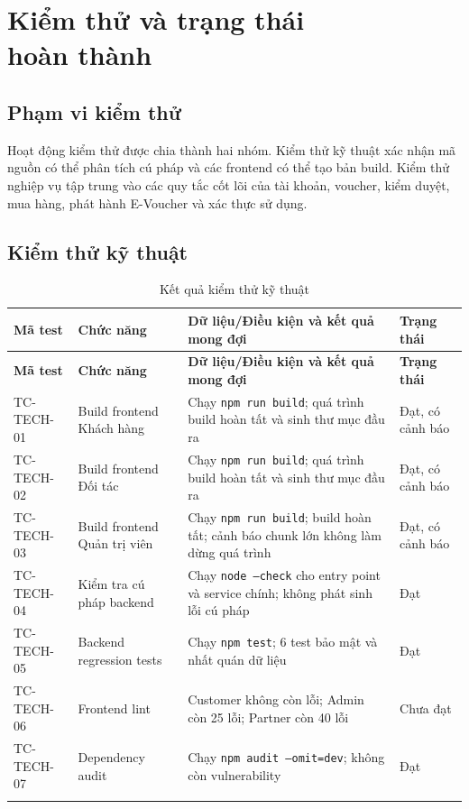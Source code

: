 \chapter[Kiểm thử và trạng thái hoàn thành]{Kiểm thử và trạng thái\\ hoàn thành}

\section{Phạm vi kiểm thử}

Hoạt động kiểm thử được chia thành hai nhóm. Kiểm thử kỹ thuật xác nhận mã nguồn có thể phân tích cú pháp và các frontend có thể tạo bản build. Kiểm thử nghiệp vụ tập trung vào các quy tắc cốt lõi của tài khoản, voucher, kiểm duyệt, mua hàng, phát hành E-Voucher và xác thực sử dụng.

\section{Kiểm thử kỹ thuật}

\begin{longtable}{|p{1.8cm}|p{3.5cm}|p{5.8cm}|p{2.3cm}|}
\hline
\textbf{Mã test} & \textbf{Chức năng} & \textbf{Dữ liệu/Điều kiện và kết quả mong đợi} & \textbf{Trạng thái} \\ \hline
\endfirsthead
\hline
\textbf{Mã test} & \textbf{Chức năng} & \textbf{Dữ liệu/Điều kiện và kết quả mong đợi} & \textbf{Trạng thái} \\ \hline
\endhead
TC-TECH-01 & Build frontend Khách hàng & Chạy \texttt{npm run build}; quá trình build hoàn tất và sinh thư mục đầu ra & Đạt, có cảnh báo \\ \hline
TC-TECH-02 & Build frontend Đối tác & Chạy \texttt{npm run build}; quá trình build hoàn tất và sinh thư mục đầu ra & Đạt, có cảnh báo \\ \hline
TC-TECH-03 & Build frontend Quản trị viên & Chạy \texttt{npm run build}; build hoàn tất; cảnh báo chunk lớn không làm dừng quá trình & Đạt, có cảnh báo \\ \hline
TC-TECH-04 & Kiểm tra cú pháp backend & Chạy \texttt{node --check} cho entry point và service chính; không phát sinh lỗi cú pháp & Đạt \\ \hline
TC-TECH-05 & Backend regression tests & Chạy \texttt{npm test}; 6 test bảo mật và nhất quán dữ liệu & Đạt \\ \hline
TC-TECH-06 & Frontend lint & Customer không còn lỗi; Admin còn 25 lỗi; Partner còn 40 lỗi & Chưa đạt \\ \hline
TC-TECH-07 & Dependency audit & Chạy \texttt{npm audit --omit=dev}; không còn vulnerability & Đạt \\ \hline
\caption[]{Kết quả kiểm thử kỹ thuật}\\
\end{longtable}

